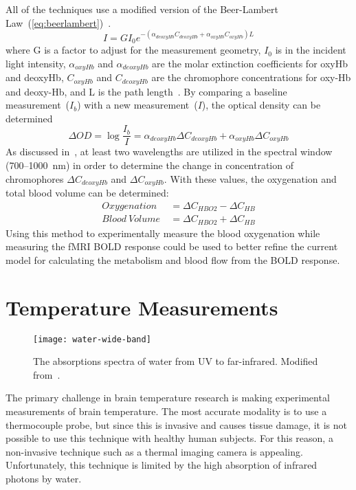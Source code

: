 All of the techniques use a modified version of the Beer-Lambert Law~(\cref{eq:beerlambert})~\citep{cope}.  
\begin{equation}
  \label{eq:modifiedbeerlamber}
  I = G I_0 e^{-(\alpha_{deoxyHb}C_{deoxyHb}+\alpha_{oxyHb}C_{oxyHb})L} 
\end{equation}
where G is a factor to adjust for the measurement geometry, $I_0$ is in the incident light intensity, $\alpha_{oxyHb}$ and $\alpha_{deoxyHb}$ are the molar extinction coefficients for oxyHb and deoxyHb, $C_{oxyHb}$ and $C_{deoxyHb}$ are the chromophore concentrations for oxy-Hb and deoxy-Hb, and L is the path length~\citep{izzetoglu2004}.  By comparing a baseline measurement~($I_b$) with a new measurement~($I$), the optical density can be determined~\citep{izzetoglu2004}
\begin{equation}
  \Delta OD = \log \frac{I_b}{I} = \alpha_{deoxyHb} \Delta C_{deoxyHb}+\alpha_{oxyHb} \Delta C_{oxyHb}
\end{equation}
As discussed in~\citet{izzetoglu2004}, at least two wavelengths are utilized in the spectral window (700--1000~nm) in order to determine the change in concentration of chromophores $\Delta C_{deoxyHb}$ and $\Delta C_{oxyHb}$.  With these values, the oxygenation and total blood volume can be determined:
\begin{align}
  \label{eq:o2bloodvolume}
  Oxygenation\ &= \Delta C_{HBO2} - \Delta C_{HB} \nonumber \\
  Blood\ Volume\ &= \Delta C_{HBO2} + \Delta C_{HB} 
\end{align}
Using this method to experimentally measure the blood oxygenation while measuring the fMRI BOLD response could be used to better refine the current model for calculating the metabolism and blood flow from the BOLD response.
\section{Temperature Measurements}
\begin{figure}[tb]
  \centering
  \texttt{[image: water-wide-band]}
  \caption[Wide-band absorption spectra of water]{\label{fig:waterabs}The absorptions spectra of water from UV to far-infrared.  Modified from~\citet{hale73}.}
\end{figure}

The primary challenge in brain temperature research is making experimental measurements of brain temperature.  The most accurate modality is to use a thermocouple probe, but since this is invasive and causes tissue damage, it is not possible to use this technique with healthy human subjects.  For this reason, a non-invasive technique such as a thermal imaging camera is appealing.  Unfortunately, this technique is limited by the high absorption of infrared photons by water.


